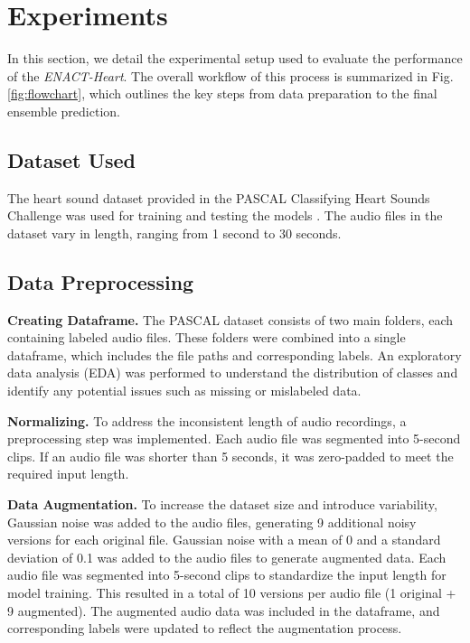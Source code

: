 \section{Experiments} \label{experiments}
In this section, we detail the experimental setup used to evaluate the performance of the \textit{ENACT-Heart}. The overall workflow of this process is summarized in Fig. \ref{fig:flowchart}, which outlines the key steps from data preparation to the final ensemble prediction.

\subsection{Dataset Used}
The heart sound dataset provided in the PASCAL Classifying Heart Sounds Challenge was used for training and testing the models \cite{bentley_pascal_nodate}. The audio files in the dataset vary in length, ranging from 1 second to 30 seconds.



\subsection{Data Preprocessing}
\textbf{Creating Dataframe.}
The PASCAL dataset consists of two main folders, each containing labeled audio files. These folders were combined into a single dataframe, which includes the file paths and corresponding labels. An exploratory data analysis (EDA) was performed to understand the distribution of classes and identify any potential issues such as missing or mislabeled data.

\textbf{Normalizing.}
To address the inconsistent length of audio recordings, a preprocessing step was implemented. Each audio file was segmented into 5-second clips. If an audio file was shorter than 5 seconds, it was zero-padded to meet the required input length.

\textbf{Data Augmentation.}
To increase the dataset size and introduce variability, Gaussian noise was added to the audio files, generating 9 additional noisy versions for each original file. Gaussian noise with a mean of 0 and a standard deviation of 0.1 was added to the audio files to generate augmented data. Each audio file was segmented into 5-second clips to standardize the input length for model training. This resulted in a total of 10 versions per audio file (1 original + 9 augmented). The augmented audio data was included in the dataframe, and corresponding labels were updated to reflect the augmentation process.

